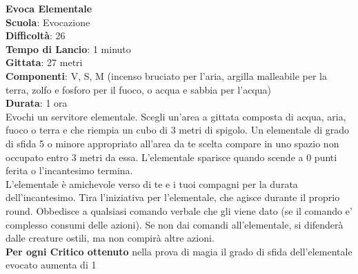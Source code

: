 \begin{multicols}{2}
\medskip\textbf{Evoca Elementale}\\
\textbf{Scuola}: Evocazione\\
\textbf{Difficoltà}: 26\\
\textbf{Tempo di Lancio}: 1 minuto\\
\textbf{Gittata}: 27 metri\\
\textbf{Componenti}: V, S, M (incenso bruciato per l'aria, argilla malleabile per la terra, zolfo e fosforo per il fuoco, o acqua e sabbia per l'acqua) \\
\textbf{Durata}: 1 ora\\
Evochi un servitore elementale. Scegli un'area a gittata composta di acqua, aria, fuoco o terra e che riempia un cubo di 3 metri di spigolo. Un elementale di grado di sfida 5 o minore appropriato all'area da te scelta compare in uno spazio non occupato entro 3 metri da essa. L'elementale sparisce quando scende a 0 punti ferita o l'incantesimo termina.\\
L'elementale è amichevole verso di te e i tuoi compagni per la durata dell'incantesimo. Tira l'iniziativa per l'elementale, che agisce durante il proprio round. Obbedisce a qualsiasi comando verbale che gli viene dato (se il comando e' complesso consumi delle azioni). Se non dai comandi all'elementale, si difenderà dalle creature ostili, ma non compirà altre azioni.\\
\textbf{Per ogni Critico ottenuto} nella prova di magia il grado di sfida dell'elementale evocato aumenta di 1


\end{multicols}
